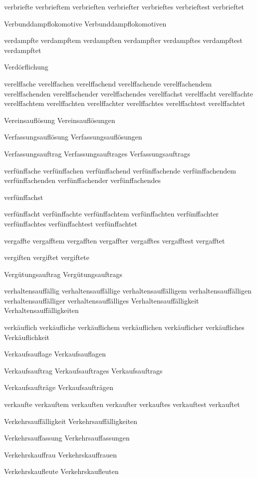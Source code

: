 verbriefte
verbrieftem
verbrieften
verbriefter
verbrieftes
verbrieftest
verbrieftet

Verbunddampflokomotive
Verbunddampflokomotiven

verdampfte
verdampftem
verdampften
verdampfter
verdampftes
verdampftest
verdampftet

Verdörflichung

verelffache 
verelffachen 
verelffachend 
verelffachende 
verelffachendem 
verelffachenden 
verelffachender 
verelffachendes 
verelffachst 
verelffacht 
verelffachte 
verelffachtem 
verelffachten
verelffachter
verelffachtes 
verelffachtest 
verelffachtet

Vereinsauflösung
Vereinsauflösungen

Verfassungsauflösung
Verfassungsauflösungen

Verfassungsauftrag
Verfassungsauftrages
Verfassungsauftrags

verfünffache
verfünffachen
verfünffachend
verfünffachende
verfünffachendem
verfünffachenden
verfünffachender
verfünffachendes

verfünffachst

verfünffacht
verfünffachte
verfünffachtem
verfünffachten
verfünffachter
verfünffachtes
verfünffachtest
verfünffachtet

vergaffte
vergafftem
vergafften
vergaffter
vergafftes
vergafftest
vergafftet

vergiften vergiftet vergiftete

Vergütungsauftrag
Vergütungsauftrags

verhaltensauffällig
verhaltensauffällige
verhaltensauffälligem
verhaltensauffälligen
verhaltensauffälliger
verhaltensauffälliges
Verhaltensauffälligkeit
Verhaltensauffälligkeiten

verkäuflich
verkäufliche
verkäuflichem
verkäuflichen
verkäuflicher
verkäufliches
Verkäuflichkeit

Verkaufsauflage
Verkaufsauflagen

Verkaufsauftrag
Verkaufsauftrages
Verkaufsauftrags

Verkaufsaufträge
Verkaufsaufträgen

verkaufte
verkauftem
verkauften
verkaufter
verkauftes
verkauftest
verkauftet

Verkehrsauffälligkeit
Verkehrsauffälligkeiten

Verkehrsauffassung
Verkehrsauffassungen

Verkehrskauffrau
Verkehrskauffrauen

Verkehrskaufleute
Verkehrskaufleuten


